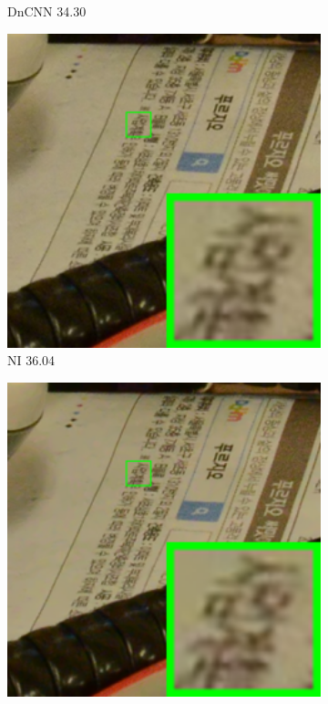 \begin{figure}
\begin{subfigure}[t]{0.19\textwidth}
		\caption{DnCNN 34.30}
    \end{subfigure}
    \hfill
    \begin{subfigure}[t]{0.19\textwidth}
        \centering
        \includegraphics[width=1\textwidth]{images/guided/cc60/resize_br_NI_CC_Noisy_Nikon_D800_ISO_3200_A1_111.png}
		\caption{NI 36.04}
    \end{subfigure}
    \hfill
    \begin{subfigure}[t]{0.19\textwidth}
        \centering
        \includegraphics[width=1\textwidth]{images/guided/cc60/resize_br_NC_CC_Noisy_Nikon_D800_ISO_3200_A1_111.png}

\end{subfigure}
\end{figure}
